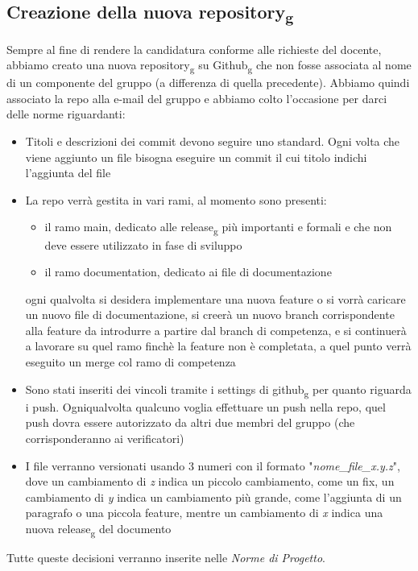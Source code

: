 \subsection{Creazione della nuova repository\textsubscript{g}}
Sempre al fine di rendere la candidatura conforme alle richieste del docente, abbiamo creato una nuova repository\textsubscript{g} su Github\textsubscript{g} che non fosse associata al nome di un componente del gruppo (a differenza di quella precedente). Abbiamo quindi associato la repo alla e-mail del gruppo e abbiamo colto l'occasione per darci delle norme riguardanti:
\begin{itemize}
	\item Titoli e descrizioni dei commit devono seguire uno standard. Ogni volta che viene aggiunto un file bisogna eseguire un commit il cui titolo indichi l'aggiunta del file
	\item La repo verrà gestita in vari rami, al momento sono presenti:
	\begin{itemize}
 		\item il ramo main, dedicato alle release\textsubscript{g} più importanti e formali e che non deve essere utilizzato in fase di sviluppo
		\item il ramo documentation, dedicato ai file di documentazione
	\end{itemize}
	ogni qualvolta si desidera implementare una nuova feature o si vorrà caricare un nuovo file di documentazione, si creerà un nuovo branch corrispondente alla feature da introdurre a partire dal branch di competenza, e si continuerà a lavorare su quel ramo finchè la feature non è completata, a quel punto verrà eseguito un merge col ramo di competenza
	\item Sono stati inseriti dei vincoli tramite i settings di github\textsubscript{g} per quanto riguarda i push. Ogniqualvolta qualcuno voglia effettuare un push nella repo, quel push dovra essere autorizzato da altri due membri del gruppo (che corrisponderanno ai verificatori)
	\item I file verranno versionati usando 3 numeri con il formato "\textit{nome\_file\_x.y.z}", dove un cambiamento di \textit{z} indica un piccolo cambiamento, come un fix, un cambiamento di \textit{y} indica un cambiamento più grande, come l'aggiunta di un paragrafo o una piccola feature, mentre  un cambiamento di \textit{x} indica una nuova release\textsubscript{g} del documento
\end{itemize}
Tutte queste decisioni verranno inserite nelle \textit{Norme di Progetto}.


